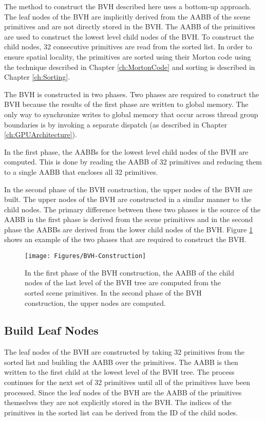 The method to construct the BVH described here uses a bottom-up approach. The leaf nodes of the BVH are implicitly derived from the AABB of the scene primitives and are not directly stored in the BVH. The AABB of the primitives are used to construct the lowest level child nodes of the BVH. To construct the child nodes, 32 consecutive primitives are read from the sorted list. In order to ensure spatial locality, the primitives are sorted using their Morton code using the technique described in Chapter \ref{ch:MortonCode} and sorting is described in Chapter \ref{ch:Sorting}.

The BVH is constructed in two phases. Two phases are required to construct the BVH because the results of the first phase are written to global memory. The only way to synchronize writes to global memory that occur across thread group boundaries is by invoking a separate dispatch (as described in Chapter \ref{ch:GPUArchitecture}).

In the first phase, the AABBs for the lowest level child nodes of the BVH are computed. This is done by reading the AABB of 32 primitives and reducing them to a single AABB that encloses all 32 primitives.

In the second phase of the BVH construction, the upper nodes of the BVH are built. The upper nodes of the BVH are constructed in a similar manner to the child nodes. The primary difference between these two phases is the source of the AABB in the first phase is derived from the scene primitives and in the second phase the AABBs are derived from the lower child nodes of the BVH. Figure \ref{fig:BVH-Construction} shows an example of the two phases that are required to construct the BVH.

\begin{figure}[H]
\centering
\texttt{[image: Figures/BVH-Construction]}
\decoRule
\caption{In the first phase of the BVH construction, the AABB of the child nodes of the last level of the BVH tree are computed from the sorted scene primitives. In the second phase of the BVH construction, the upper nodes are computed. }
\label{fig:BVH-Construction}
\end{figure}

\subsection{Build Leaf Nodes}

The leaf nodes of the BVH are constructed by taking 32 primitives from the sorted list and building the AABB over the primitives. The AABB is then written to the first child at the lowest level of the BVH tree. The process continues for the next set of 32 primitives until all of the primitives have been processed. Since the leaf nodes of the BVH are the AABB of the primitives themselves they are not explicitly stored in the BVH. The indices of the primitives in the sorted list can be derived from the ID of the child nodes.

